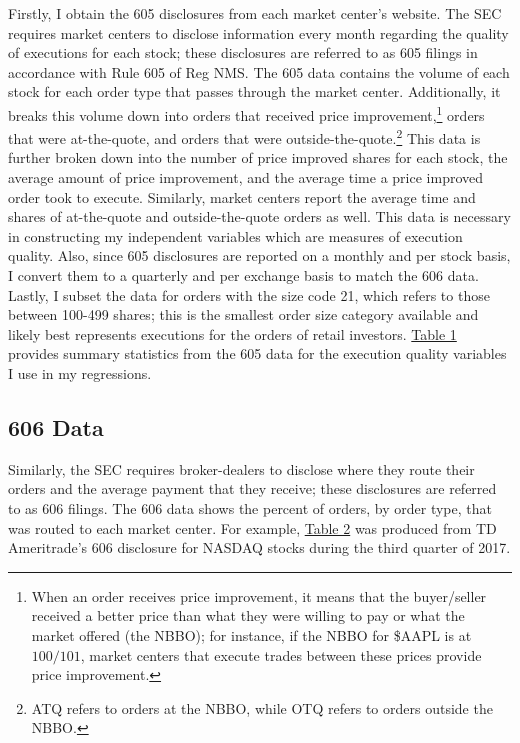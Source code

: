 \documentclass[12pt,a4paper]{extarticle}
\begin{document}
		Firstly, I obtain the 605 disclosures from each market center's website. The SEC requires market centers to disclose information every month regarding the quality of executions for each stock; these disclosures are referred to as 605 filings in accordance with Rule 605 of Reg NMS. The 605 data contains the volume of each stock for each order type that passes through the market center. Additionally, it breaks this volume down into orders that received price improvement,\footnote{  When an order receives price improvement, it means that the buyer/seller received a better price than what they were willing to pay or what the market offered (the NBBO); for instance, if the NBBO for \$AAPL is at $100/101$, market centers that execute trades between these prices provide price improvement.} orders that were at-the-quote, and orders that were outside-the-quote.\footnote{  ATQ refers to orders at the NBBO, while OTQ refers to orders outside the NBBO.} This data is further broken down into the number of price improved shares for each stock, the average amount of price improvement, and the average time a price improved order took to execute. Similarly, market centers report the average time and shares of at-the-quote and outside-the-quote orders as well. This data is necessary in constructing my independent variables which are measures of execution quality. Also, since 605 disclosures are reported on a monthly and per stock basis, I convert them to a quarterly and per exchange basis to match the 606 data. Lastly, I subset the data for orders with the size code 21, which refers to those between 100-499 shares; this is the smallest order size category available and likely best represents executions for the orders of retail investors. \hyperref[table:1]{Table 1} provides summary statistics from the 605 data for the execution quality variables I use in my regressions.
		
	\subsection{606 Data}
	
		Similarly, the SEC requires broker-dealers to disclose where they route their orders and the average payment that they receive; these disclosures are referred to as 606 filings. The 606 data shows the percent of orders, by order type, that was routed to each market center. For example, \hyperref[table:2]{Table 2} was produced from TD Ameritrade's 606 disclosure for NASDAQ stocks during the third quarter of 2017. 
		
\end{document}
